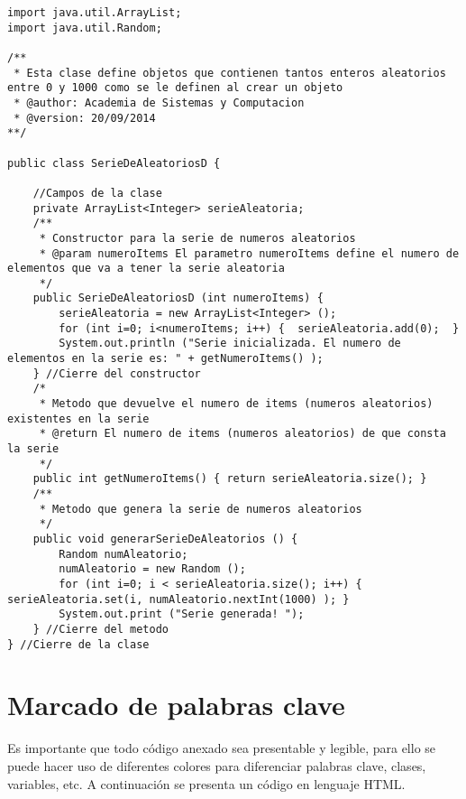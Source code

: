 \begin{lstlisting}
import java.util.ArrayList;
import java.util.Random;
 
/**
 * Esta clase define objetos que contienen tantos enteros aleatorios entre 0 y 1000 como se le definen al crear un objeto
 * @author: Academia de Sistemas y Computacion
 * @version: 20/09/2014
**/
 
public class SerieDeAleatoriosD {
 
    //Campos de la clase
    private ArrayList<Integer> serieAleatoria;
    /**
     * Constructor para la serie de numeros aleatorios
     * @param numeroItems El parametro numeroItems define el numero de elementos que va a tener la serie aleatoria
     */
    public SerieDeAleatoriosD (int numeroItems) {
        serieAleatoria = new ArrayList<Integer> ();
        for (int i=0; i<numeroItems; i++) {  serieAleatoria.add(0);  }
        System.out.println ("Serie inicializada. El numero de elementos en la serie es: " + getNumeroItems() );
    } //Cierre del constructor
    /*
     * Metodo que devuelve el numero de items (numeros aleatorios) existentes en la serie
     * @return El numero de items (numeros aleatorios) de que consta la serie
     */
    public int getNumeroItems() { return serieAleatoria.size(); }
    /**
     * Metodo que genera la serie de numeros aleatorios
     */
    public void generarSerieDeAleatorios () {
        Random numAleatorio;
        numAleatorio = new Random ();
        for (int i=0; i < serieAleatoria.size(); i++) { serieAleatoria.set(i, numAleatorio.nextInt(1000) ); }
        System.out.print ("Serie generada! ");
    } //Cierre del metodo
} //Cierre de la clase
\end{lstlisting}

\section{Marcado de palabras clave}

Es importante que todo c\'odigo anexado sea presentable y legible, para ello se puede hacer uso de diferentes colores para diferenciar  palabras clave, clases, variables, etc. A continuaci\'on se presenta un c\'odigo en lenguaje HTML.

